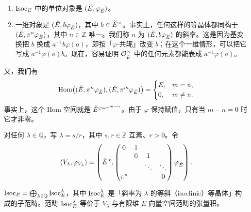 \begin{example}\mbox{}\par
\begin{enumerate}[label=(\arabic*),leftmargin=2.2em]
  \item $\operatorname{Isoc}_E$ 中的单位对象是 $(\breve{E},\varphi_{\breve{E}})$。
  \item 一维对象是 $(\breve{E},b\varphi_{\breve{E}})$，其中 $b\in\breve{E}^{\times}$。事实上，任何这样的等晶体都同构于 $(\breve{E},\pi^n\varphi_{\breve{E}})$，其中 $n\in\mathbb{Z}$ 唯一。我们称 $n$ 为 $(\breve{E},b\varphi_{\breve{E}})$ 的斜率。这是因为基变换把 $b$ 换成 $a^{-1}b\varphi(a)$，即按「$\varphi$-共轭」改变 $b$；在这个一维情形，可以把它写成 $a^{-1}\varphi(a)b$。现在，容易证明 $\mathcal{O}_{\breve{E}}^{\times}$ 中的任何元素都能表成 $a^{-1}\varphi(a)$。
\end{enumerate}
\end{example}

又，我们有
\[
\operatorname{Hom}\bigl((\breve{E},\pi^{n}\varphi_{\breve{E}}),(\breve{E},\pi^{m}\varphi_{\breve{E}})\bigr)
=\begin{cases}
E, & m=n,\\
0, & m\neq n.
\end{cases}
\]
事实上，这个 Hom 空间就是 $\breve{E}^{\varphi=\pi^{m-n}}$。由于 $\varphi$ 保持赋值，只有当 $m-n=0$ 时它才非零。

对任何 $\lambda\in\mathbb{Q}$，写 $\lambda=s/r$，其中 $s,r\in\mathbb{Z}$ 互素、$r>0$。令
\[
(V_\lambda,\varphi_{V_\lambda})
=\left(\breve{E}^{\,r},
\begin{pmatrix}
0&1&&\\
&0&1&\\
&&\ddots&\ddots\\
\pi^{s}&&&0
\end{pmatrix}\varphi_{\breve{E}}\right).
\]

\begin{theorem}
$\operatorname{Isoc}_E=\bigoplus_{\lambda\in\mathbb{Q}}\operatorname{Isoc}_E^\lambda$，其中 $\operatorname{Isoc}_E^\lambda$ 是「斜率为 $\lambda$ 的等斜（isoclinic）等晶体」构成的子范畴。范畴 $\operatorname{Isoc}_E^\lambda$ 等价于 $V_\lambda$ 与有限维 $E$-向量空间范畴的张量积。
\end{theorem}

